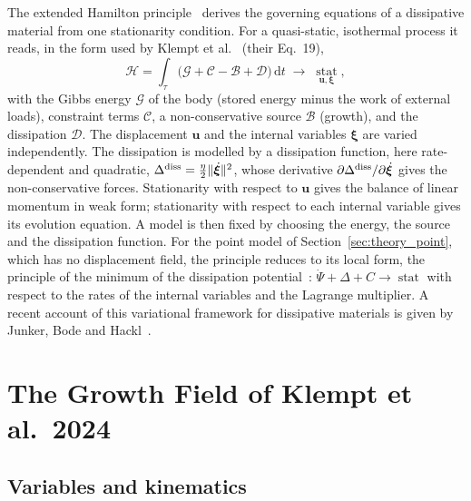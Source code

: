 The extended Hamilton principle~\cite{JunkerBalzani2021ExtendedHamilton}
derives the governing equations of a dissipative material from one stationarity
condition. For a quasi-static, isothermal process it reads, in the form used by
Klempt et al.~\cite{Klempt2024DiffusionDrivenGrowth} (their Eq.~19),
\begin{equation}
  \mathcal H=\int_\tau\bigl(\mathcal G+\mathcal C-\mathcal B+\mathcal D\bigr)\,\mathrm dt
  \;\to\;\operatorname*{stat}_{\mathbf u,\boldsymbol\xi},
  \label{eq:hamilton_principle}
\end{equation}
with the Gibbs energy $\mathcal G$ of the body (stored energy minus the work of
external loads), constraint terms $\mathcal C$, a non-conservative source
$\mathcal B$ (growth), and the dissipation $\mathcal D$. The displacement
$\mathbf u$ and the internal variables $\boldsymbol\xi$ are varied
independently. The dissipation is modelled by a dissipation function, here
rate-dependent and quadratic,
$\Delta^{\rm diss}=\tfrac{\eta}{2}\|\dot{\boldsymbol\xi}\|^2$, whose derivative
$\partial\Delta^{\rm diss}/\partial\dot{\boldsymbol\xi}$ gives the
non-conservative forces. Stationarity with respect to $\mathbf u$ gives the
balance of linear momentum in weak form; stationarity with respect to each
internal variable gives its evolution equation. A model is then fixed by
choosing the energy, the source and the dissipation function.
For the point model of Section~\ref{sec:theory_point}, which has no displacement field,
the principle reduces to its local form, the principle of the minimum of the
dissipation potential~\cite{junker2014principle, hackl1997generalized}:
$\dot\Psi+\Delta+C\to\operatorname{stat}$ with respect to the rates of the
internal variables and the Lagrange multiplier. A recent account of this
variational framework for dissipative materials is given by Junker, Bode and
Hackl~\cite{JunkerBodeHackl2025Holistic}.

\section{The Growth Field of Klempt et al.\ 2024}
\label{sec:theory_field}

\subsection{Variables and kinematics}

